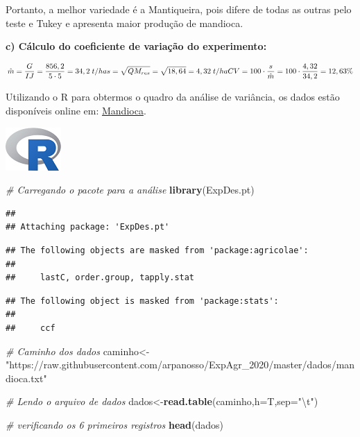 \documentclass[
]{book}
\newenvironment{Shaded}{\begin{snugshade}}{\end{snugshade}}
\newcommand{\CharTok}[1]{\textcolor[rgb]{0.31,0.60,0.02}{#1}}
\newcommand{\CommentTok}[1]{\textcolor[rgb]{0.56,0.35,0.01}{\textit{#1}}}
\newcommand{\DataTypeTok}[1]{\textcolor[rgb]{0.13,0.29,0.53}{#1}}
\newcommand{\KeywordTok}[1]{\textcolor[rgb]{0.13,0.29,0.53}{\textbf{#1}}}
\newcommand{\NormalTok}[1]{#1}
\newcommand{\StringTok}[1]{\textcolor[rgb]{0.31,0.60,0.02}{#1}}
\begin{document}
Portanto, a melhor variedade é a Mantiqueira, pois difere de todas as outras pelo teste e Tukey e apresenta maior produção de mandioca.

\textbf{c) Cálculo do coeficiente de variação do experimento:}

\[
\hat{m} = \frac{G}{IJ} = \frac{856,2}{5 \cdot 5} = 34,2 \;t/ha \\
s = \sqrt{QM_{res}} = \sqrt{18,64} = 4,32\;t/ha \\
CV = 100 \cdot \frac{s}{\hat{m}} = 100 \cdot \frac{4,32}{34,2} = 12,63\%
\]

Utilizando o R para obtermos o quadro da análise de variância, os dados estão disponíveis online em: \href{https://raw.githubusercontent.com/arpanosso/ExpAgr_2020/master/dados/mandioca.txt}{Mandioca}.

\includegraphics{Rlogo.png}

\begin{Shaded}
\begin{Highlighting}[]
\CommentTok{# Carregando o pacote para a análise}
\KeywordTok{library}\NormalTok{(ExpDes.pt)}
\end{Highlighting}
\end{Shaded}

\begin{verbatim}
## 
## Attaching package: 'ExpDes.pt'
\end{verbatim}

\begin{verbatim}
## The following objects are masked from 'package:agricolae':
## 
##     lastC, order.group, tapply.stat
\end{verbatim}

\begin{verbatim}
## The following object is masked from 'package:stats':
## 
##     ccf
\end{verbatim}

\begin{Shaded}
\begin{Highlighting}[]
\CommentTok{# Caminho dos dados}
\NormalTok{caminho<-}\StringTok{"https://raw.githubusercontent.com/arpanosso/ExpAgr_2020/master/dados/mandioca.txt"}

\CommentTok{# Lendo o arquivo de dados}
\NormalTok{dados<-}\KeywordTok{read.table}\NormalTok{(caminho,}\DataTypeTok{h=}\NormalTok{T,}\DataTypeTok{sep=}\StringTok{"}\CharTok{\textbackslash{}t}\StringTok{"}\NormalTok{)}

\CommentTok{# verificando os 6 primeiros registros}
\KeywordTok{head}\NormalTok{(dados)}
\end{Highlighting}
\end{Shaded}
\end{document}
